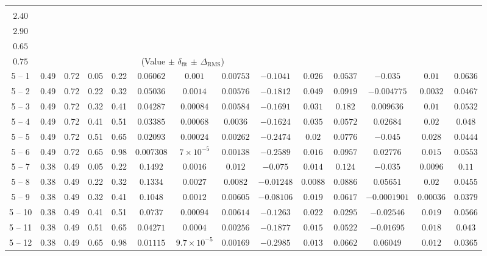 \begin{longtable}{|*{14}{c|}}
 & \makecell{$Q^{2}_{\min}$\\$2.40$} & \makecell{$Q^{2}_{\max}$\\$2.90$} & \makecell{$y_{\min}$\\$0.65$} & \makecell{$y_{\max}$\\$0.75$} & \multicolumn{9}{c|}{(Value $\pm$ $\delta_{\mathrm{fit}}$ $\pm$ $\Delta_{\mathrm{RMS}}$)} \\
\hline
5 -- 1 & 0.49 & 0.72 & 0.05 & 0.22 & $0.06062$ & $0.001$ & $0.00753$ & $-0.1041$ & $0.026$ & $0.0537$ & $-0.035$ & $0.01$ & $0.0636$ \\
\hline
5 -- 2 & 0.49 & 0.72 & 0.22 & 0.32 & $0.05036$ & $0.0014$ & $0.00576$ & $-0.1812$ & $0.049$ & $0.0919$ & $-0.004775$ & $0.0032$ & $0.0467$ \\
\hline
5 -- 3 & 0.49 & 0.72 & 0.32 & 0.41 & $0.04287$ & $0.00084$ & $0.00584$ & $-0.1691$ & $0.031$ & $0.182$ & $0.009636$ & $0.01$ & $0.0532$ \\
\hline
5 -- 4 & 0.49 & 0.72 & 0.41 & 0.51 & $0.03385$ & $0.00068$ & $0.0036$ & $-0.1624$ & $0.035$ & $0.0572$ & $0.02684$ & $0.02$ & $0.048$ \\
\hline
5 -- 5 & 0.49 & 0.72 & 0.51 & 0.65 & $0.02093$ & $0.00024$ & $0.00262$ & $-0.2474$ & $0.02$ & $0.0776$ & $-0.045$ & $0.028$ & $0.0444$ \\
\hline
5 -- 6 & 0.49 & 0.72 & 0.65 & 0.98 & $0.007308$ & $7\times 10^{-5}$ & $0.00138$ & $-0.2589$ & $0.016$ & $0.0957$ & $0.02776$ & $0.015$ & $0.0553$ \\
\hline
5 -- 7 & 0.38 & 0.49 & 0.05 & 0.22 & $0.1492$ & $0.0016$ & $0.012$ & $-0.075$ & $0.014$ & $0.124$ & $-0.035$ & $0.0096$ & $0.11$ \\
\hline
5 -- 8 & 0.38 & 0.49 & 0.22 & 0.32 & $0.1334$ & $0.0027$ & $0.0082$ & $-0.01248$ & $0.0088$ & $0.0886$ & $0.05651$ & $0.02$ & $0.0455$ \\
\hline
5 -- 9 & 0.38 & 0.49 & 0.32 & 0.41 & $0.1048$ & $0.0012$ & $0.00605$ & $-0.08106$ & $0.019$ & $0.0617$ & $-0.0001901$ & $0.00036$ & $0.0379$ \\
\hline
5 -- 10 & 0.38 & 0.49 & 0.41 & 0.51 & $0.0737$ & $0.00094$ & $0.00614$ & $-0.1263$ & $0.022$ & $0.0295$ & $-0.02546$ & $0.019$ & $0.0566$ \\
\hline
5 -- 11 & 0.38 & 0.49 & 0.51 & 0.65 & $0.04271$ & $0.0004$ & $0.00256$ & $-0.1877$ & $0.015$ & $0.0522$ & $-0.01695$ & $0.018$ & $0.043$ \\
\hline
5 -- 12 & 0.38 & 0.49 & 0.65 & 0.98 & $0.01115$ & $9.7\times 10^{-5}$ & $0.00169$ & $-0.2985$ & $0.013$ & $0.0662$ & $0.06049$ & $0.012$ & $0.0365$ \\

\end{longtable}
